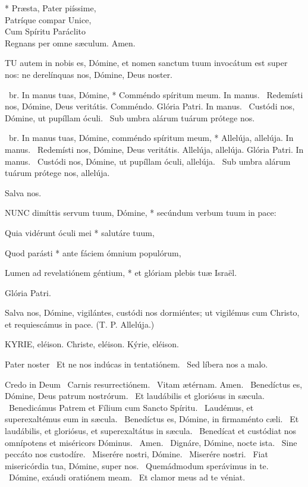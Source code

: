 * Præsta, Pater piíssime,\\
Patríque compar Unice,\\
Cum Spíritu Paráclito\\
Regnans per omne sæculum. Amen.


\lettrine[lines=2]{T}{U} autem in nobis es, Dómine, et nomen sanctum tuum invocátum est super nos: ne derelínquas nos, Dómine, Deus noster.

\R\ br. In manus tuas, Dómine, * Comméndo spíritum meum. In manus. \V\ Redemísti nos, Dómine, Deus veritátis. Comméndo. Glória Patri. In manus. \V\ Custódi nos, Dómine, ut pupíllam óculi. \R\ Sub umbra alárum tuárum prótege nos.



\R\ br. In manus tuas, Dómine, comméndo spíritum meum, * Allelúja, allelúja. In manus. \V\ Redemísti nos, Dómine, Deus veritátis. Allelúja, allelúja. Glória Patri. In manus. \V\ Custódi nos, Dómine, ut pupíllam óculi, allelúja. \R\ Sub umbra alárum tuárum prótege nos, allelúja.

 Salva nos.


\lettrine[lines=2]{N}{UNC} dimíttis servum tuum, Dómine, * secúndum verbum tuum in pace:

Quia vidérunt óculi mei * salutáre tuum,

Quod parásti * ante fáciem ómnium populórum,

Lumen ad revelatiónem géntium, * et glóriam plebis tuæ Israël.

Glória Patri.

 Salva nos, Dómine, vigilántes, custódi nos dormiéntes; ut vigilémus cum Christo, et requiescámus in pace. (T. P. Allelúja.)


KYRIE, eléison. Christe, eléison. Kýrie, eléison.

Pater noster  \V\ Et ne nos indúcas in tentatiónem. \R\ Sed líbera nos a malo.

Credo in Deum  \V\ Carnis resurrectiónem. \R\ Vitam ætérnam. Amen. \V\ Benedíctus es, Dómine, Deus patrum nostrórum. \R\ Et laudábilis et gloriósus in sæcula. \V\ Benedicámus Patrem et Fílium cum Sancto Spíritu. \R\ Laudémus, et superexaltémus eum in sæcula. \V\ Benedíctus es, Dómine, in firmaménto cæli. \R\ Et laudábilis, et gloriósus, et superexaltátus in sæcula. \V\ Benedícat et custódiat nos omnípotens et miséricors Dóminus. \R\ Amen. \V\ Dignáre, Dómine, nocte ista. \R\ Sine peccáto nos custodíre. \V\ Miserére nostri, Dómine. \R\ Miserére nostri. \V\ Fiat misericórdia tua, Dómine, super nos. \R\ Quemádmodum sperávimus in te. \V\ Dómine, exáudi oratiónem meam. \R\ Et clamor meus ad te véniat.

